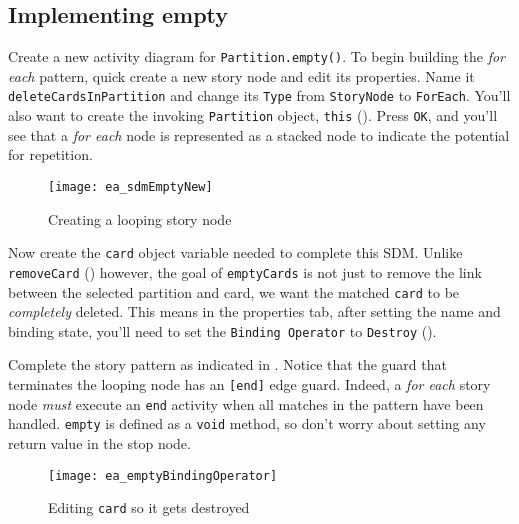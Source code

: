 \newpage
\hypertarget{emptyPartition vis}{}
\subsection{Implementing empty}
\genHeader

\begin{stepbystep}

\item Create a new activity diagram for \texttt{Partition.empty()}. To begin building the \emph{for each} pattern, quick create a new
story node and edit its properties. Name it \texttt{deleteCardsInPartition} and change its \texttt{Type} from \texttt{StoryNode} to \texttt{ForEach}. You'll
also want to create the invoking \texttt{Partition} object, \texttt{this} (). Press \texttt{OK}, and you'll see that a \emph{for each}
node is represented as a stacked node to indicate the potential for repetition.

\begin{figure}[htbp]
\begin{center}
  \texttt{[image: ea\_sdmEmptyNew]}
  \caption{Creating a looping story node}  
  \label{ea:sdm_foreach}
\end{center}
\end{figure}

\item Now create the \texttt{card} object variable needed to complete this SDM. Unlike \texttt{removeCard}
() however, the goal of \texttt{emptyCards} is not just to remove the link between the selected partition and card, we
want the matched \texttt{card} to be \emph{completely} deleted. This means in the properties tab, after setting the name and binding state, you'll need to set
the \texttt{Binding Operator} to \texttt{Destroy} ().

\item Complete the story pattern as indicated in . Notice that the guard that terminates the looping node has an
\texttt{[end]} edge guard. Indeed, a \emph{for each} story node \emph{must} execute an \texttt{end} activity when all matches in the pattern have been
handled. \texttt{empty} is defined as a \texttt{void} method, so don't worry about setting any return value in the stop node.

\begin{figure}[htbp]
\begin{center}
  \texttt{[image: ea\_emptyBindingOperator]}
  \caption{Editing \texttt{card} so it gets destroyed}  
  \label{ea:sdm_bindingOperator}
\end{center}
\end{figure}


\end{stepbystep}
